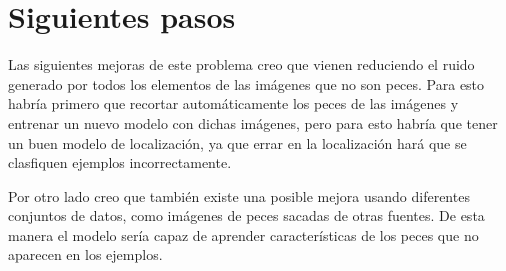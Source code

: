 \section{Siguientes pasos}

Las siguientes mejoras de este problema creo que vienen reduciendo el ruido generado por todos los elementos de las imágenes que no son peces. Para esto habría primero que recortar automáticamente los peces de las imágenes y entrenar un nuevo modelo con dichas imágenes, pero para esto habría que tener un buen modelo de localización, ya que errar en la localización hará que se clasfiquen ejemplos incorrectamente.

Por otro lado creo que también existe una posible mejora usando diferentes conjuntos de datos, como imágenes de peces sacadas de otras fuentes. De esta manera el modelo sería capaz de aprender características de los peces que no aparecen en los ejemplos.
